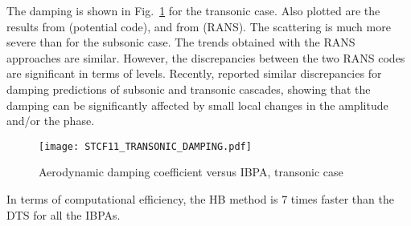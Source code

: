 The damping is shown in Fig.~\ref{fig:stcf11_transonic_damping} for
the transonic case. Also plotted are the results from
\citet{Fransson1999} (potential code), and 
from \citet{Cinnella2004} (RANS). The scattering is much more severe
than for the subsonic case. The trends obtained with the RANS approaches are similar. However, the
discrepancies between the two RANS codes are significant in terms of
levels.
Recently, \citet{Vogt:2011fk} reported similar discrepancies 
for damping predictions of subsonic and transonic cascades, 
showing that the damping can be significantly affected by 
small local changes in the amplitude and/or the phase.
\begin{figure}[htb]
  \centering
  \texttt{[image: STCF11\_TRANSONIC\_DAMPING.pdf]}
  \caption{Aerodynamic damping coefficient versus IBPA, transonic
    case}
  \label{fig:stcf11_transonic_damping}
\end{figure}
In terms of computational efficiency, the HB method is 7 times faster
than the DTS  for all the IBPAs.